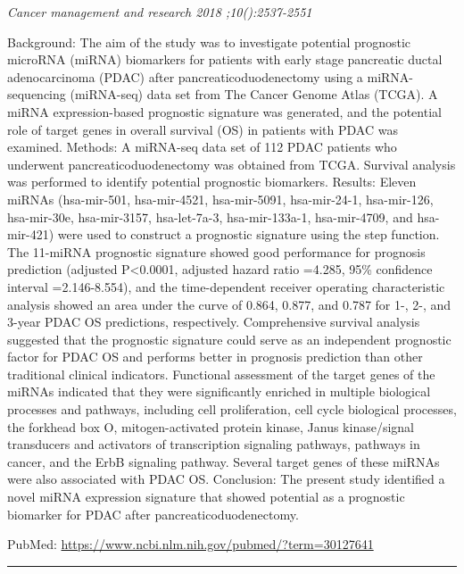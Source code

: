 \documentclass[]{article}
\begin{document}
\emph{Cancer management and research 2018 ;10():2537-2551}

Background: The aim of the study was to investigate potential prognostic
microRNA (miRNA) biomarkers for patients with early stage pancreatic
ductal adenocarcinoma (PDAC) after pancreaticoduodenectomy using a
miRNA-sequencing (miRNA-seq) data set from The Cancer Genome Atlas
(TCGA). A miRNA expression-based prognostic signature was generated, and
the potential role of target genes in overall survival (OS) in patients
with PDAC was examined. Methods: A miRNA-seq data set of 112 PDAC
patients who underwent pancreaticoduodenectomy was obtained from TCGA.
Survival analysis was performed to identify potential prognostic
biomarkers. Results: Eleven miRNAs (hsa-mir-501, hsa-mir-4521,
hsa-mir-5091, hsa-mir-24-1, hsa-mir-126, hsa-mir-30e, hsa-mir-3157,
hsa-let-7a-3, hsa-mir-133a-1, hsa-mir-4709, and hsa-mir-421) were used
to construct a prognostic signature using the step function. The
11-miRNA prognostic signature showed good performance for prognosis
prediction (adjusted P\textless{}0.0001, adjusted hazard ratio =4.285,
95\% confidence interval =2.146-8.554), and the time-dependent receiver
operating characteristic analysis showed an area under the curve of
0.864, 0.877, and 0.787 for 1-, 2-, and 3-year PDAC OS predictions,
respectively. Comprehensive survival analysis suggested that the
prognostic signature could serve as an independent prognostic factor for
PDAC OS and performs better in prognosis prediction than other
traditional clinical indicators. Functional assessment of the target
genes of the miRNAs indicated that they were significantly enriched in
multiple biological processes and pathways, including cell
proliferation, cell cycle biological processes, the forkhead box O,
mitogen-activated protein kinase, Janus kinase/signal transducers and
activators of transcription signaling pathways, pathways in cancer, and
the ErbB signaling pathway. Several target genes of these miRNAs were
also associated with PDAC OS. Conclusion: The present study identified a
novel miRNA expression signature that showed potential as a prognostic
biomarker for PDAC after pancreaticoduodenectomy.

PubMed: \url{https://www.ncbi.nlm.nih.gov/pubmed/?term=30127641}

{}

{}

\begin{center}\rule{0.5\linewidth}{\linethickness}\end{center}
\end{document}
